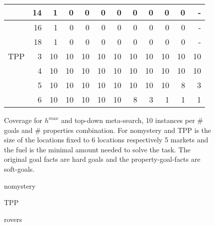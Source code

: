 \begin{figure}[ht]
\begin{tabular}{l|r|rrrrrrrrrr}
				& 14 & 1 & 0 & 0 & 0 & 0 & 0 & 0 & 0 & 0 & - \\\hline 
				& 16 & 1 & 0 & 0 & 0 & 0 & 0 & 0 & 0 & 0 & - \\\hline 
				& 18 & 1 & 0 & 0 & 0 & 0 & 0 & 0 & 0 & 0 & - \\\hline\hline
		TPP & 3 & 10 & 10 & 10 & 10 & 10 & 10 & 10 & 10 & 10 & 10\\\hline
			& 4 & 10 & 10 & 10 & 10 & 10 & 10 & 10 & 10 & 10 & 10\\\hline
			& 5 & 10 & 10 & 10 & 10 & 10 & 10 & 10 & 10 & 8 & 3\\\hline
			& 6 & 10 & 10 & 10 & 10 & 10 & 8 & 3 & 1 & 1 & 1\\\hline


	\end{tabular}
	\caption{Coverage for $h^{max}$ and top-down meta-search, 10 instances per \# goals and \# properties combination.
	For nomystery and TPP is the size of the locations fixed to 6 locations respectively 5 markets and the fuel is the 
	minimal amount needed to solve the task.
	The original goal facts are hard goals and the property-goal-facts are soft-goals.}
\end{figure}


\FloatBarrier
\begin{figure*}[ht]

\caption{nomystery}
\end{figure*}


\begin{figure*}[ht]

\caption{TPP}
\end{figure*}


\begin{figure*}[ht]

\caption{rovers}
\end{figure*}
